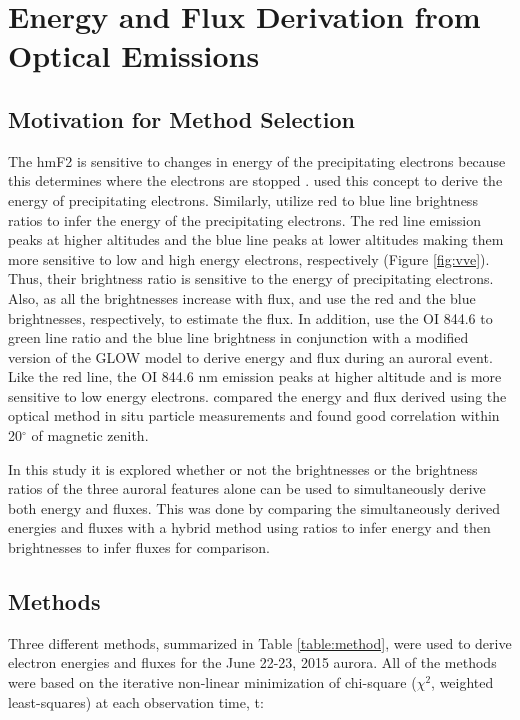 \documentclass[crop=false,class=mitthesis,oneside,font=12pt]{standalone}
\begin{document}
\section{Energy and Flux Derivation from Optical Emissions}
\subsection{Motivation for Method Selection}
The hmF2 is sensitive to changes in energy of the precipitating electrons because this determines where the electrons are stopped \citep{rees_1963}. \cite{pallamraju_2011} used this concept to derive the energy of precipitating electrons. Similarly, \cite{rees_1974} utilize red to blue line brightness ratios to infer the energy of the precipitating electrons. The red line emission peaks at higher altitudes and the blue line peaks at lower altitudes making them more sensitive to low and high energy electrons, respectively (Figure \ref{fig:vve}). Thus, their brightness ratio is sensitive to the energy of precipitating electrons. Also, as all the brightnesses increase with flux, \cite{pallamraju_2011} and \cite{rees_1963} use the red and the blue brightnesses, respectively, to estimate the flux. In addition, \citet{grubbs_compare} use the OI 844.6 to green line ratio and the blue line brightness in conjunction with a modified version of the GLOW model to derive energy and flux during an auroral event. Like the red line, the OI 844.6 nm emission peaks at higher altitude and is more sensitive to low energy electrons. \citet{grubbs_compare} compared the energy and flux derived using the optical method in situ particle measurements and found good correlation within 20$^\circ$ of magnetic zenith.

In this study it is explored whether or not the brightnesses or the brightness ratios of the three auroral features alone can be used to simultaneously derive both energy and fluxes. This was done by comparing the simultaneously derived energies and fluxes with a hybrid method using ratios to infer energy and then brightnesses to infer fluxes for comparison. 



\subsection{Methods}
Three different methods, summarized in Table \ref{table:method}, were used to derive electron energies and fluxes for the June 22-23, 2015 aurora. 
All of the methods were based on the iterative non-linear minimization of chi-square ($\chi^2$, weighted least-squares) at each observation time, t:
\end{document}
